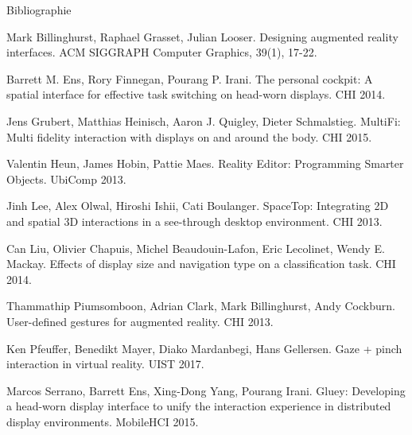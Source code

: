 \begin{frame}[allowframebreaks]{Bibliographie}
  \begin{thebibliography}{10}
      Mark Billinghurst, Raphael Grasset, Julian Looser.
      \newblock Designing augmented reality interfaces.
      \newblock ACM SIGGRAPH Computer Graphics, 39(1), 17-22.

      Barrett M. Ens, Rory Finnegan, Pourang P. Irani.
      \newblock The personal cockpit: A spatial interface for effective task switching on head-worn displays.
      \newblock CHI 2014.

      Jens Grubert, Matthias Heinisch, Aaron J. Quigley, Dieter Schmalstieg.
      \newblock MultiFi: Multi fidelity interaction with displays on and around the body.
      \newblock CHI 2015.

      Valentin Heun, James Hobin, Pattie Maes.
      \newblock Reality Editor: Programming Smarter Objects.
      \newblock UbiComp 2013.

      Jinh Lee, Alex Olwal, Hiroshi Ishii, Cati Boulanger.
      \newblock SpaceTop: Integrating 2D and spatial 3D interactions in a see-through desktop environment.
      \newblock CHI 2013.

      Can Liu, Olivier Chapuis, Michel Beaudouin-Lafon, Eric Lecolinet, Wendy E. Mackay.
      \newblock Effects of display size and navigation type on a classification task.
      \newblock CHI 2014.

      Thammathip Piumsomboon, Adrian Clark, Mark Billinghurst, Andy Cockburn.
      \newblock User-defined gestures for augmented reality.
      \newblock CHI 2013.

      Ken Pfeuffer, Benedikt Mayer, Diako Mardanbegi, Hans Gellersen.
      \newblock Gaze + pinch interaction in virtual reality.
      \newblock UIST 2017.

      Marcos Serrano, Barrett Ens, Xing-Dong Yang, Pourang Irani.
      \newblock Gluey: Developing a head-worn display interface to unify the interaction experience in distributed display environments.
      \newblock MobileHCI 2015.


\end{thebibliography}
\end{frame}
